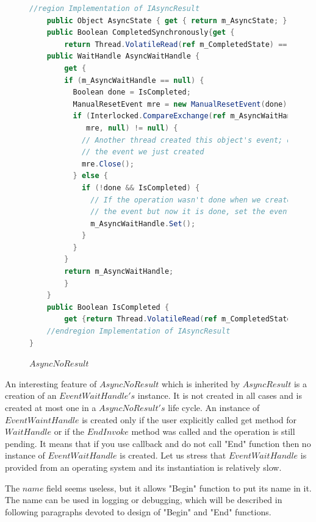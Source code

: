 \documentclass[12pt,notitlepage]{report}
\begin{document}
\begin{figure}[!hbp]
\begin{lstlisting}[language=cs]
	//region Implementation of IAsyncResult
	public Object AsyncState { get { return m_AsyncState; } }
	public Boolean CompletedSynchronously{get { 
		return Thread.VolatileRead(ref m_CompletedState) ==  ic_scs; }}
	public WaitHandle AsyncWaitHandle {
	    get {
		if (m_AsyncWaitHandle == null) {
		  Boolean done = IsCompleted;
		  ManualResetEvent mre = new ManualResetEvent(done);
		  if (Interlocked.CompareExchange(ref m_AsyncWaitHandle,
		     mre, null) != null) {
		    // Another thread created this object's event; dispose 
		    // the event we just created
		    mre.Close();
		  } else {
		    if (!done && IsCompleted) {
		      // If the operation wasn't done when we created 
		      // the event but now it is done, set the event
		      m_AsyncWaitHandle.Set();
		    }
		  }
		}
		return m_AsyncWaitHandle;
	    }
	}
	public Boolean IsCompleted {
		get {return Thread.VolatileRead(ref m_CompletedState) != c_sp; }}
	//endregion Implementation of IAsyncResult
}
\end{lstlisting}
\caption{$AsyncNoResult$} 
\label{noresult}
\end{figure}


	An interesting feature of $AsyncNoResult$ which is inherited by $AsyncResult$ is a creation of an $EventWaitHandle's$ instance.
	It is not created in all cases and is created at most one in a $AsyncNoResult's$ life cycle.
	An instance of $EventWaintHandle$ is created only if the user explicitly called get method for $WaitHandle$ or
	if the $EndInvoke$ method was called and the operation is still pending.
	It means that if you use callback and do not call "End" function then no instance of $EventWaitHandle$ is created.
	Let us stress that $EventWaitHandle$ is provided from an operating system and its instantiation is relatively slow.

	The $name$ field seems useless, but it allows "Begin" function to put its name in it. 
	The name can be used in logging or debugging, which will be described in following paragraphs devoted 
	to design of "Begin" and "End" functions.
\end{document}
